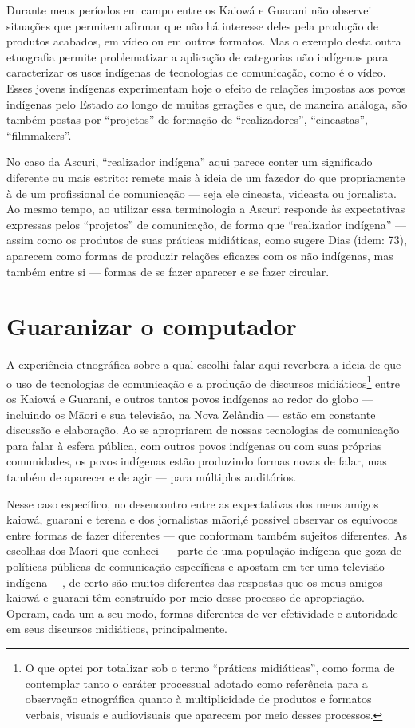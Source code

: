 Durante meus períodos em campo entre os Kaiowá e Guarani não observei
situações que permitem afirmar que não há interesse deles pela produção
de produtos acabados, em vídeo ou em outros formatos. Mas o exemplo
desta outra etnografia permite problematizar a aplicação de categorias
não indígenas para caracterizar os usos indígenas de tecnologias de
comunicação, como é o vídeo. Esses jovens indígenas experimentam hoje o
efeito de relações impostas aos povos indígenas pelo Estado ao longo de
muitas gerações e que, de maneira análoga, são também postas por
``projetos'' de formação de ``realizadores'', ``cineastas'', ``filmmakers''.

No caso da Ascuri, ``realizador indígena'' aqui parece conter um
significado diferente ou mais estrito: remete mais à ideia de um
fazedor do que propriamente à de um profissional de comunicação — seja
ele cineasta, videasta ou jornalista. Ao mesmo tempo, ao utilizar essa
terminologia a Ascuri responde às expectativas expressas pelos
``projetos'' de comunicação, de forma que ``realizador indígena'' — assim
como os produtos de suas práticas midiáticas, como sugere Dias (idem:
73), aparecem como formas de produzir relações eficazes com os não
indígenas, mas também entre si — formas de se fazer aparecer e se fazer
circular.


\section{Guaranizar o computador}

A experiência etnográfica sobre a qual escolhi falar aqui reverbera a
ideia de que o uso de tecnologias de comunicação e a produção de
discursos midiáticos\footnote{O que optei por totalizar sob o termo
``práticas midiáticas'', como forma de contemplar tanto o caráter
processual adotado como referência para a observação etnográfica quanto
à multiplicidade de produtos e formatos verbais, visuais e audiovisuais
que aparecem por meio desses processos.} entre os Kaiowá e Guarani, e
outros tantos povos indígenas ao redor do globo — incluindo os M\=aori
e sua televisão, na Nova Zelândia — estão em constante discussão e
elaboração. Ao se apropriarem de nossas tecnologias de comunicação para
falar à esfera pública, com outros povos indígenas ou com suas próprias
comunidades, os povos indígenas estão produzindo formas novas de falar,
mas também de aparecer e de agir — para múltiplos auditórios.

Nesse caso específico, no desencontro entre as expectativas dos meus
amigos kaiowá, guarani e terena e dos jornalistas m\=aori,é possível observar os
equívocos entre formas de fazer diferentes — que conformam também
sujeitos diferentes. As escolhas dos M\=aori que conheci — parte de uma
população indígena que goza de políticas públicas de comunicação
específicas e apostam em ter uma televisão indígena —, de certo são
muitos diferentes das respostas que os meus amigos kaiowá e guarani têm
construído por meio desse processo de apropriação. Operam, cada um a
seu modo, formas diferentes de ver efetividade e autoridade em seus
discursos midiáticos, principalmente.

